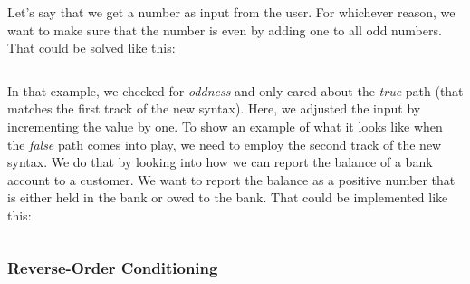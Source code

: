 \begin{syntaxfloat}
  
  \caption{Statements for branching}
  \label{syntax:flow:branch}
\end{syntaxfloat}

Let's say that we get a number as input from the user. For whichever reason, we want to make sure that the number is even by adding one to all odd numbers. That could be solved like this:

\inputminted[linenos]{csharp}{../src/csharp/flow_branch/if/Program.cs}

In that example, we checked for \textsl{oddness} and only cared about the \textsl{true} path (that matches the first track of the new syntax). Here, we adjusted the input by incrementing the value by one. To show an example of what it looks like when the \textsl{false} path comes into play, we need to employ the second track of the new syntax. We do that by looking into how we can report the balance of a bank account to a customer. We want to report the balance as a positive number that is either held in the bank or owed to the bank. That could be implemented like this:

\inputminted[linenos]{csharp}{../src/csharp/flow_branch/ifelse/Program.cs}



\subsubsection{Reverse-Order Conditioning}

